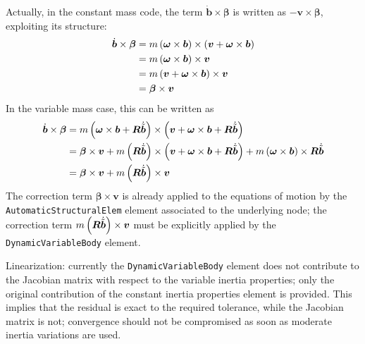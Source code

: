 \documentclass[10pt,dvips,fleqn,subeqn]{report}
\newcommand{\T}[1]{\bm{#1}}
\newcommand{\TT}[1]{\bm{#1}}
\begin{document}
Actually, in the constant mass code, the term $\dot{\T{b}} \times \T{\beta}$
is written as $-\T{v}\times\T{\beta}$, exploiting its structure:
\begin{align}
	\dot{\T{b}} \times \T{\beta}
	&=
	m \plbr{\T{\omega} \times \T{b}} \times \plbr{\T{v} + \T{\omega} \times \T{b}}
	\nonumber \\
	&=
	m \plbr{\T{\omega} \times \T{b}} \times \T{v}
	\nonumber \\
	&=
	m \plbr{\T{v} + \T{\omega} \times \T{b}} \times \T{v}
	\nonumber \\
	&=
	\T{\beta} \times \T{v}
\end{align}
In the variable mass case, this can be written as
\begin{align}
	\dot{\T{b}} \times \T{\beta}
	&=
	m \plbr{\T{\omega} \times \T{b} + \TT{R} \dot{\tilde{\T{b}}}} \times
		\plbr{\T{v} + \T{\omega} \times \T{b} + \TT{R} \dot{\tilde{\T{b}}}}
	\nonumber \\
	&=
	\T{\beta} \times \T{v}
	+
	m \plbr{\TT{R} \dot{\tilde{\T{b}}}} \times 
		\plbr{\T{v} + \T{\omega} \times \T{b} + \TT{R} \dot{\tilde{\T{b}}}}
	+
	m \plbr{\T{\omega} \times \T{b}} \times \TT{R} \dot{\tilde{\T{b}}}
	\nonumber \\
	&=
	\T{\beta} \times \T{v}
	+
	m \plbr{\TT{R} \dot{\tilde{\T{b}}}} \times \T{v}
\end{align}
The correction term $\T{\beta} \times \T{v}$ is already applied
to the equations of motion by the \texttt{AutomaticStructuralElem}
element associated to the underlying node;
the correction term $m \plbr{\TT{R} \dot{\tilde{\T{b}}}} \times \T{v}$
must be explicitly applied by the \texttt{DynamicVariableBody} element.

\bigskip
Linearization:
currently the \texttt{DynamicVariableBody} element does not contribute
to the Jacobian matrix with respect to the variable inertia properties;
only the original contribution of the constant inertia properties element
is provided.
This implies that the residual is exact to the required tolerance,
while the Jacobian matrix is not; convergence should not be compromised
as soon as moderate inertia variations are used.
\end{document}
